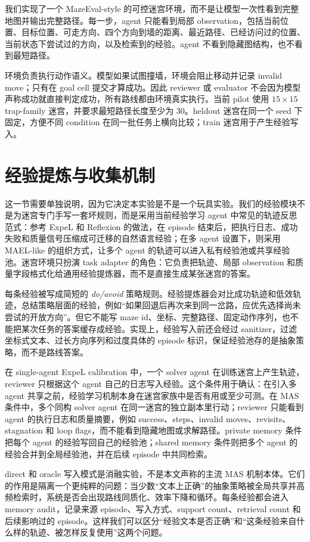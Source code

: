 \documentclass[UTF8,11pt]{ctexart}
\begin{document}
我们实现了一个 MazeEval-style 的可控迷宫环境，而不是让模型一次性看到完整地图并输出完整路径。每一步，agent 只能看到局部 observation，包括当前位置、目标位置、可走方向、四个方向到墙的距离、最近路径、已经访问过的位置、当前状态下尝试过的方向，以及检索到的经验。agent 不看到隐藏图结构，也不看到最短路径。

环境负责执行动作语义。模型如果试图撞墙，环境会阻止移动并记录 invalid move；只有在 goal cell 提交才算成功。因此 reviewer 或 evaluator 不会因为模型声称成功就直接判定成功，所有路线都由环境真实执行。当前 pilot 使用 $15 \times 15$ trap-family 迷宫，并要求最短路径长度至少为 30。heldout 迷宫在同一个 seed 下固定，方便不同 condition 在同一批任务上横向比较；train 迷宫用于产生经验写入。

\section{经验提炼与收集机制}

这一节需要单独说明，因为它决定本实验是不是一个玩具实验。我们的经验模块不是为迷宫专门手写一套坏规则，而是采用当前经验学习 agent 中常见的轨迹反思范式：参考 ExpeL 和 Reflexion 的做法，在 episode 结束后，把执行日志、成功失败和质量信号压缩成可迁移的自然语言经验；在多 agent 设置下，则采用 MAEL-like 的组织方式，让多个 agent 的轨迹可以进入私有经验池或共享经验池。迷宫环境只扮演 task adapter 的角色：它负责把轨迹、局部 observation 和质量字段格式化给通用经验提炼器，而不是直接生成某张迷宫的答案。

每条经验被写成简短的 \emph{do/avoid} 策略规则。经验提炼器会对比成功轨迹和低效轨迹，总结策略层面的经验，例如“如果回退后再次来到同一岔路，应优先选择尚未尝试的开放方向”。但它不能写 maze id、坐标、完整路径、固定动作序列，也不能把某次任务的答案缓存成经验。实现上，经验写入前还会经过 sanitizer，过滤坐标式文本、过长方向序列和过度具体的 episode 标识，保证经验池存的是抽象策略，而不是路线答案。

在 single-agent ExpeL calibration 中，一个 solver agent 在训练迷宫上产生轨迹，reviewer 只根据这个 agent 自己的日志写入经验。这个条件用于确认：在引入多 agent 共享之前，经验学习机制本身在迷宫家族中是否有用或至少可测。在 MAS 条件中，多个同构 solver agent 在同一迷宫的独立副本里行动；reviewer 只能看到 agent 的执行日志和质量摘要，例如 success、steps、invalid moves、revisits、stagnation 和 loop flags，而不能看到隐藏地图或求解路径。private memory 条件把每个 agent 的经验写回自己的经验池；shared memory 条件则把多个 agent 的经验合并到全局经验池，并在后续 episode 中共同检索。

direct 和 oracle 写入模式是消融实验，不是本文声称的主流 MAS 机制本体。它们的作用是隔离一个更纯粹的问题：当少数“文本上正确”的抽象策略被全局共享并高频检索时，系统是否会出现路线同质化、效率下降和循环。每条经验都会进入 memory audit，记录来源 episode、写入方式、support count、retrieval count 和后续影响过的 episode。这样我们可以区分“经验文本是否正确”和“这条经验来自什么样的轨迹、被怎样反复使用”这两个问题。
\end{document}
